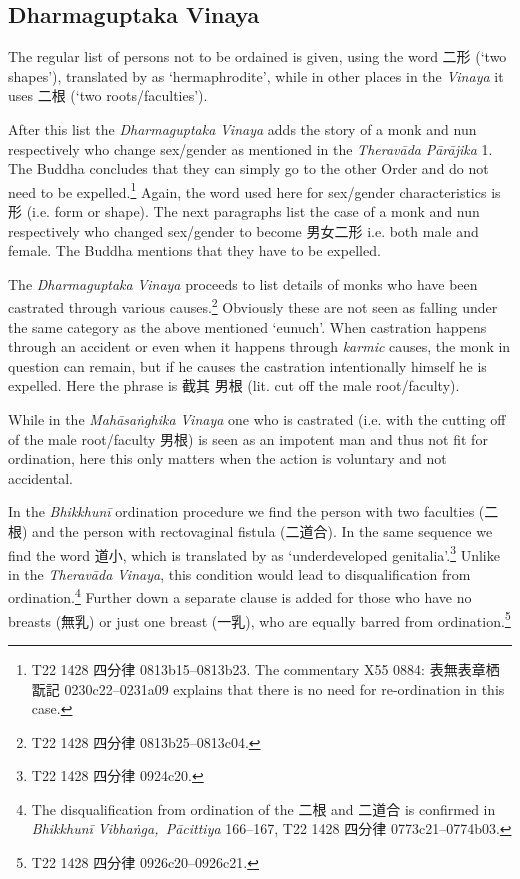 \subsection{Dharmaguptaka Vinaya}
The regular list of persons not to be ordained is given, using the word 二形 (`two shapes'), translated by \cite{bodhi} as `hermaphrodite', while in other places in the \textit{Vinaya} it uses 二根 (`two roots/faculties'). 

After this list the \textit{Dharmaguptaka} \textit{Vinaya} adds the story of a monk and nun respectively who change sex/gender as mentioned in the \textit{Theravāda} \textit{Pārājika} 1. The Buddha concludes that they can simply go to the other Order and do not need to be expelled.\footnote{T22 1428 四分律 0813b15–0813b23. The commentary X55 0884: 表無表章栖翫記 0230c22–0231a09 explains that there is no need for re-ordination in this case.} Again, the word used here for sex/gender characteristics is 形 (i.e. form or shape). The next paragraphs list the case of a monk and nun respectively who changed sex/gender to become 男女二形 i.e. both male and female. The Buddha mentions that they have to be expelled.

The \textit{Dharmaguptaka} \textit{Vinaya} proceeds to list details of monks who have been castrated through various causes.\footnote{T22 1428 四分律 0813b25–0813c04.} Obviously these are not seen as falling under the same category as the above mentioned `eunuch'. When castration happens through an accident or even when it happens through \textit{karmic} causes, the monk in question can remain, but if he causes the castration intentionally himself he is expelled. Here the phrase is 截其 男根 (lit. cut off the male root/faculty).

While in the \textit{Mahāsaṅghika} \textit{Vinaya} one who is castrated (i.e. with the cutting off of the male root/faculty 男根) is seen as an impotent man and thus not fit for ordination, here this only matters when the action is voluntary and not accidental.

In the \textit{Bhikkhunī} ordination procedure we find the person with two faculties (二根) and the person with rectovaginal fistula (二道合). In the same sequence we find the word 道小, which is translated by \cite{bodhi} as `underdeveloped genitalia'.\footnote{T22 1428 四分律 0924c20.} Unlike in the \textit{Theravāda} \textit{Vinaya}, this condition would lead to disqualification from ordination.\footnote{The disqualification from ordination of the 二根 and 二道合 is confirmed in \textit{Bhikkhunī Vibhaṅga, Pācittiya} 166–167, T22 1428 四分律 0773c21–0774b03.} Further down a separate clause is added for those who have no breasts (無乳) or just one breast (一乳), who are equally barred from ordination.\footnote{T22 1428 四分律 0926c20–0926c21.}

